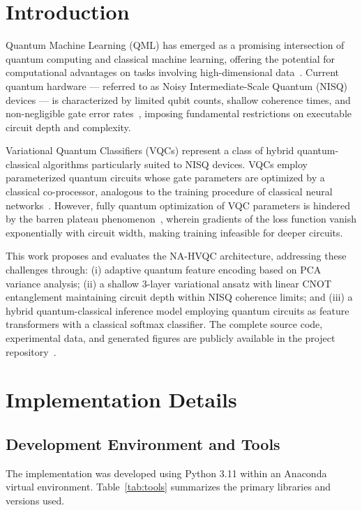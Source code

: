 \documentclass[conference]{IEEEtran}
\begin{document}
\section{Introduction}

Quantum Machine Learning (QML) has emerged as a promising intersection of quantum computing and classical machine learning, offering the potential for computational advantages on tasks involving high-dimensional data~\cite{bharti2022}. Current quantum hardware — referred to as Noisy Intermediate-Scale Quantum (NISQ) devices — is characterized by limited qubit counts, shallow coherence times, and non-negligible gate error rates~\cite{bharti2022}, imposing fundamental restrictions on executable circuit depth and complexity.

Variational Quantum Classifiers (VQCs) represent a class of hybrid quantum-classical algorithms particularly suited to NISQ devices. VQCs employ parameterized quantum circuits whose gate parameters are optimized by a classical co-processor, analogous to the training procedure of classical neural networks~\cite{havlicek2019}. However, fully quantum optimization of VQC parameters is hindered by the barren plateau phenomenon~\cite{mcclean2018}, wherein gradients of the loss function vanish exponentially with circuit width, making training infeasible for deeper circuits.

This work proposes and evaluates the NA-HVQC architecture, addressing these challenges through: (i) adaptive quantum feature encoding based on PCA variance analysis; (ii) a shallow 3-layer variational ansatz with linear CNOT entanglement maintaining circuit depth within NISQ coherence limits; and (iii) a hybrid quantum-classical inference model employing quantum circuits as feature transformers with a classical softmax classifier. The complete source code, experimental data, and generated figures are publicly available in the project repository~\cite{kabeer2025github}.

\section{Implementation Details}

\subsection{Development Environment and Tools}

The implementation was developed using Python 3.11 within an Anaconda virtual environment. Table~\ref{tab:tools} summarizes the primary libraries and versions used.
\end{document}
